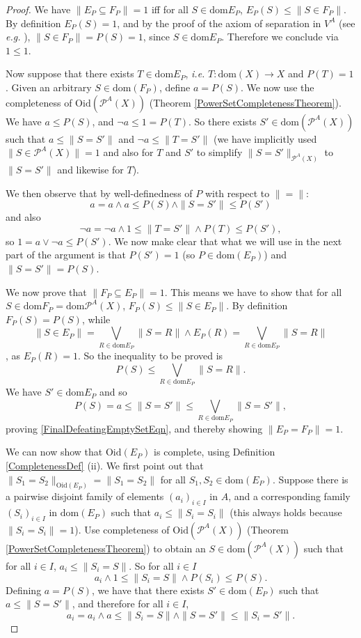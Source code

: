 \documentclass{lmcs}
\newcommand{\dom}{\ensuremath{\mathrm{dom}}}
\newcommand{\powerset}{\ensuremath{\mathcal{P}}}
\newcommand{\apowerset}{\powerset^A}
\newcommand{\beq}{\|\mbox{$=$}\|}
\newcommand{\Oid}{\mathrm{Oid}}
\newcommand{\bvs}[1]{\| {#1} \|}
\begin{document}
\begin{proof}
We have $\bvs{E_P \subseteq F_P} = 1$ iff for all $S \in \dom{E_P}$, $E_P(S) \leq \bvs{S \in F_P}$. By definition $E_P(S) = 1$, and by the proof of the axiom of separation in $V^A$ (see \emph{e.g.} \cite[Theorem 14.24]{jech}), $\bvs{S \in F_P} = P(S) = 1$, since $S \in \dom{E_P}$. Therefore we conclude via $1 \leq 1$. 

Now suppose that there exists $T \in \dom{E_P}$, \emph{i.e.} $T : \dom(X) \rightarrow X$ and $P(T) = 1$. Given an arbitrary $S \in \dom(F_P)$, define $a = P(S)$. We now use the completeness of $\Oid(\apowerset(X))$ (Theorem \ref{PowerSetCompletenessTheorem}). We have $a \leq P(S)$, and $\lnot a \leq 1 = P(T)$. So there exists $S' \in \dom(\apowerset(X))$ such that $a \leq \bvs{S = S'}$ and $\lnot a \leq \bvs{T = S'}$ (we have implicitly used $\bvs{S \in \apowerset(X)} = 1$ and also for $T$ and $S'$ to simplify $\bvs{S = S'}_{\apowerset(X)}$ to $\bvs{S = S'}$ and likewise for $T$). 

We then observe that by well-definedness of $P$ with respect to $\beq$:
\[
a  = a \land a \leq P(S) \land \bvs{S = S'} \leq P(S')
\]
and also
\[
\lnot a = \lnot a \land 1 \leq \bvs{T = S'} \land P(T) \leq P(S'),
\]
so $1 = a \lor \lnot a \leq P(S')$. We now make clear that what we will use in the next part of the argument is that $P(S') = 1$ (so $P \in \dom(E_P)$) and $\bvs{S = S'} = P(S)$. 

We now prove that $\bvs{F_P \subseteq E_P} = 1$. This means we have to show that for all $S \in \dom{F_P} = \dom{\apowerset(X)}$, $F_P(S) \leq \bvs{S \in E_P}$. By definition $F_P(S) = P(S)$, while 
\[
\bvs{S \in E_P} = \bigvee_{R \in \dom{E_P}} \bvs{S = R} \land E_P(R) = \bigvee_{R \in \dom{E_P}} \bvs{S = R}
\],
as $E_P(R) = 1$. So the inequality to be proved is
\begin{equation}
\label{FinalDefeatingEmptySetEqn}
P(S) \leq \bigvee_{R \in \dom{E_P}} \bvs{S = R}.
\end{equation}
We have $S' \in \dom{E_P}$ and so
\[
P(S) = a \leq \bvs{S = S'} \leq \bigvee_{R \in \dom{E_P}} \bvs{S = S'},
\]
proving \eqref{FinalDefeatingEmptySetEqn}, and thereby showing $\bvs{E_P = F_P} = 1$. 

We can now show that $\Oid(E_P)$ is complete, using Definition \ref{CompletenessDef} (ii). We first point out that $\bvs{S_1 = S_2}_{\Oid(E_P)} = \bvs{S_1 = S_2}$ for all $S_1,S_2 \in \dom(E_P)$. Suppose there is a pairwise disjoint family of elements $(a_i)_{i \in I}$ in $A$, and a corresponding family $(S_i)_{i \in I}$ in $\dom(E_P)$ such that $a_i \leq \bvs{S_i = S_i}$ (this always holds because $\bvs{S_i = S_i} = 1$). Use completeness of $\Oid(\apowerset(X))$ (Theorem \ref{PowerSetCompletenessTheorem}) to obtain an $S \in \dom(\apowerset(X))$ such that for all $i \in I$, $a_i \leq \bvs{S_i = S}$. So for all $i \in I$
\[
a_i \land 1 \leq \bvs{S_i = S} \land P(S_i) \leq P(S).
\]
Defining $a = P(S)$, we have that there exists $S' \in \dom(E_P)$ such that $a \leq \bvs{S = S'}$, and therefore for all $i \in I$,
\[
a_i = a_i \land a \leq \bvs{S_i = S} \land \bvs{S = S'} \leq \bvs{S_i = S'}.
\]
\end{proof}
\end{document}
